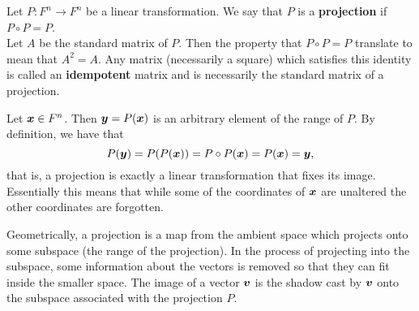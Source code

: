 \begin{Def} Let $P : F^n\to F^n$ be a linear transformation. We say that $P$ is a \textbf{projection} if $P\circ P = P$.\\

 Let $A$ be the standard matrix of $P$. Then the property that $P\circ P = P$ translate to mean that $A^2=A$. Any matrix (necessarily a square) which satisfies this identity is called an \textbf{idempotent} matrix and is necessarily the standard matrix of a projection.
\end{Def}\vs

Let $\boldsymbol x\in F^n$. Then $\boldsymbol y = P(\boldsymbol x)$ is an arbitrary element of the range of $P$. By definition, we have that 
\[P(\boldsymbol y) = P(P(\boldsymbol x)) = P\circ P(\boldsymbol x) = P(\boldsymbol x) = \boldsymbol y,\] that is, a projection is exactly a linear transformation that fixes its image. Essentially this means that while some of the coordinates of $\boldsymbol x$ are unaltered the other coordinates are forgotten. \\

\begin{multicols}{2}
Geometrically, a projection is a map from the ambient space which projects onto some subspace (the range of the projection). In the process of projecting into the subspace, some information about the vectors is removed so that they can fit inside the smaller space. 
The image of a vector $\boldsymbol v$ is the shadow cast by $\boldsymbol v$ onto the subspace associated with the projection $P$.\\\

\begin{center}
\end{center}
\end{multicols}

